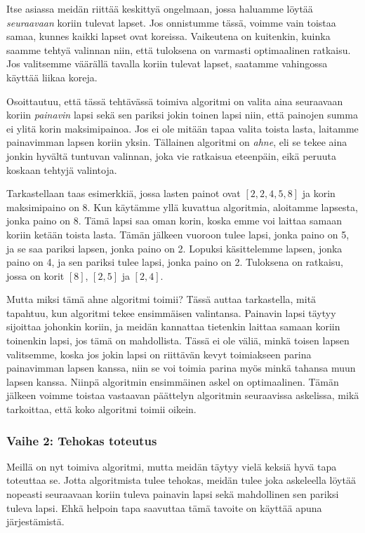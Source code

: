 Itse asiassa meidän riittää keskittyä ongelmaan,
jossa haluamme löytää \emph{seuraavaan} koriin
tulevat lapset.
Jos onnistumme tässä, voimme vain toistaa samaa,
kunnes kaikki lapset ovat koreissa.
Vaikeutena on kuitenkin, kuinka saamme tehtyä valinnan niin,
että tuloksena on varmasti optimaalinen ratkaisu.
Jos valitsemme väärällä tavalla koriin tulevat lapset,
saatamme vahingossa käyttää liikaa koreja.

Osoittautuu, että tässä tehtävässä toimiva algoritmi
on valita aina seuraavaan koriin \emph{painavin} lapsi sekä sen pariksi
jokin toinen lapsi niin, että painojen summa ei ylitä
korin maksimipainoa.
Jos ei ole mitään tapaa valita toista lasta,
laitamme painavimman lapsen koriin yksin.
Tällainen algoritmi on \emph{ahne}, eli se tekee aina jonkin
hyvältä tuntuvan valinnan, joka vie ratkaisua eteenpäin,
eikä peruuta koskaan tehtyjä valintoja.

Tarkastellaan taas esimerkkiä,
jossa lasten painot ovat $[2,2,4,5,8]$
ja korin maksimipaino on 8.
Kun käytämme yllä kuvattua algoritmia,
aloitamme lapsesta, jonka paino on 8.
Tämä lapsi saa oman korin, koska emme voi laittaa
samaan koriin ketään toista lasta.
Tämän jälkeen vuoroon tulee lapsi, jonka paino on 5,
ja se saa pariksi lapsen, jonka paino on 2.
Lopuksi käsittelemme lapsen, jonka paino on 4,
ja sen pariksi tulee lapsi, jonka paino on 2.
Tuloksena on ratkaisu, jossa on korit $[8]$, $[2,5]$ ja $[2,4]$.

Mutta miksi tämä ahne algoritmi toimii?
Tässä auttaa tarkastella, mitä tapahtuu,
kun algoritmi tekee ensimmäisen valintansa.
Painavin lapsi täytyy sijoittaa johonkin koriin,
ja meidän kannattaa tietenkin laittaa samaan koriin toinenkin lapsi,
jos tämä on mahdollista.
Tässä ei ole väliä, minkä toisen lapsen valitsemme,
koska jos jokin lapsi on riittävän kevyt toimiakseen
parina painavimman lapsen kanssa, niin se voi toimia parina
myös minkä tahansa muun lapsen kanssa.
Niinpä algoritmin ensimmäinen askel on optimaalinen.
Tämän jälkeen voimme toistaa vastaavan päättelyn
algoritmin seuraavissa askelissa, mikä tarkoittaa,
että koko algoritmi toimii oikein.

\subsubsection{Vaihe 2: Tehokas toteutus}

Meillä on nyt toimiva algoritmi,
mutta meidän täytyy vielä keksiä hyvä tapa toteuttaa se.
Jotta algoritmista tulee tehokas,
meidän tulee joka askeleella löytää nopeasti seuraavaan
koriin tuleva painavin lapsi sekä mahdollinen sen pariksi tuleva lapsi.
Ehkä helpoin tapa saavuttaa tämä tavoite on käyttää apuna järjestämistä.

